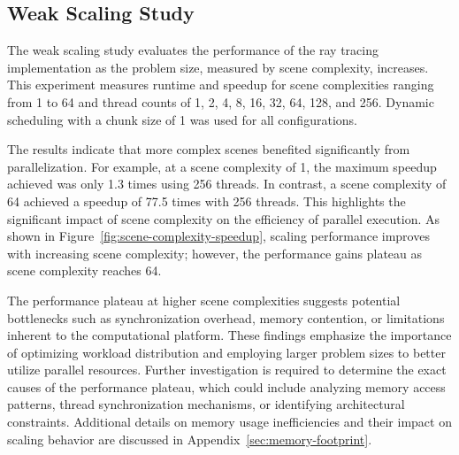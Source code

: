 \subsection{Weak Scaling Study}
\label{subsec:weak-scaling-study}

The weak scaling study evaluates the performance of the ray tracing implementation as the problem size, measured by scene complexity, increases. This experiment measures runtime and speedup for scene complexities ranging from 1 to 64 and thread counts of 1, 2, 4, 8, 16, 32, 64, 128, and 256. Dynamic scheduling with a chunk size of 1 was used for all configurations.

The results indicate that more complex scenes benefited significantly from parallelization. For example, at a scene complexity of 1, the maximum speedup achieved was only 1.3 times using 256 threads. In contrast, a scene complexity of 64 achieved a speedup of 77.5 times with 256 threads. This highlights the significant impact of scene complexity on the efficiency of parallel execution. As shown in Figure~\ref{fig:scene-complexity-speedup}, scaling performance improves with increasing scene complexity; however, the performance gains plateau as scene complexity reaches 64.

The performance plateau at higher scene complexities suggests potential bottlenecks such as synchronization overhead, memory contention, or limitations inherent to the computational platform. These findings emphasize the importance of optimizing workload distribution and employing larger problem sizes to better utilize parallel resources. Further investigation is required to determine the exact causes of the performance plateau, which could include analyzing memory access patterns, thread synchronization mechanisms, or identifying architectural constraints. Additional details on memory usage inefficiencies and their impact on scaling behavior are discussed in Appendix~\ref{sec:memory-footprint}.

